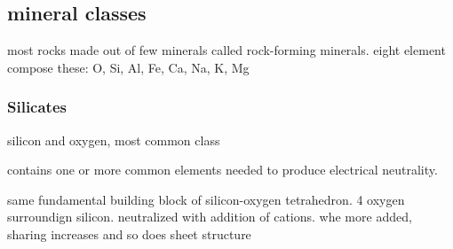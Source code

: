 \documentclass[11pt]{amsart}
\begin{document}
  \subsection{mineral classes}
  \par most rocks made out of few minerals called rock-forming minerals.
  eight element compose these: O, Si, Al, Fe, Ca, Na, K, Mg
  \subsubsection{Silicates}
  \par silicon and oxygen, most common class
  \par contains one or more common elements needed to produce electrical
  neutrality.
  \par same fundamental building block of silicon-oxygen tetrahedron. 4
  oxygen surroundign silicon. neutralized with addition of cations. whe more
  added, sharing increases and so does sheet structure
\end{document}
